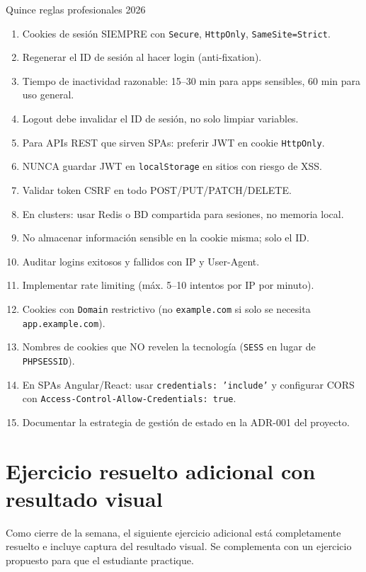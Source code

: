 \documentclass[11pt,a4paper,openany]{book}
\begin{document}
\begin{cajabuenas}{Quince reglas profesionales 2026}
\begin{enumerate}
\item Cookies de sesión SIEMPRE con \texttt{Secure},
\texttt{HttpOnly}, \texttt{SameSite=Strict}.
\item Regenerar el ID de sesión al hacer login (anti-fixation).
\item Tiempo de inactividad razonable: 15--30 min para apps
sensibles, 60 min para uso general.
\item Logout debe invalidar el ID de sesión, no solo limpiar variables.
\item Para APIs REST que sirven SPAs: preferir JWT en cookie
\texttt{HttpOnly}.
\item NUNCA guardar JWT en \texttt{localStorage} en sitios con riesgo
de XSS.
\item Validar token CSRF en todo POST/PUT/PATCH/DELETE.
\item En clusters: usar Redis o BD compartida para sesiones, no
memoria local.
\item No almacenar información sensible en la cookie misma; solo el ID.
\item Auditar logins exitosos y fallidos con IP y User-Agent.
\item Implementar rate limiting (máx. 5--10 intentos por IP por minuto).
\item Cookies con \texttt{Domain} restrictivo (no
\texttt{example.com} si solo se necesita \texttt{app.example.com}).
\item Nombres de cookies que NO revelen la tecnología
(\texttt{SESS} en lugar de \texttt{PHPSESSID}).
\item En SPAs Angular/React: usar \texttt{credentials: 'include'} y
configurar CORS con \texttt{Access-Control-Allow-Credentials: true}.
\item Documentar la estrategia de gestión de estado en la ADR-001 del
proyecto.
\end{enumerate}
\end{cajabuenas}

\section{Ejercicio resuelto adicional con resultado visual}

Como cierre de la semana, el siguiente ejercicio adicional
está completamente resuelto e incluye captura del resultado visual.
Se complementa con un ejercicio propuesto para que el estudiante
practique.
\end{document}
